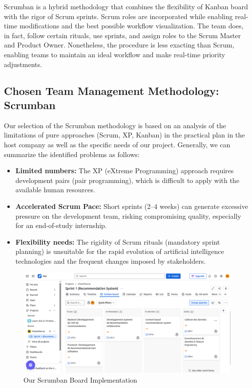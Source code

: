Scrumban is a hybrid methodology that combines the flexibility of Kanban board with the rigor of Scrum sprints. Scrum roles are incorporated while enabling real-time modifications and the best possible workflow visualization. The team does, in fact, follow certain rituals, use sprints, and assign roles to the Scrum Master and Product Owner. Nonetheless, the procedure is less exacting than Scrum, enabling teams to maintain an ideal workflow and make real-time priority adjustments.
   


\subsection{Chosen Team Management Methodology: Scrumban}
Our selection of the Scrumban methodology is based on an analysis of the limitations of pure approaches (Scrum, XP, Kanban) in the practical plan in the host company as well as the specific needs of our project. Generally, we can summarize the identified problems as follows:
\begin{itemize}
    \item \textbf{Limited numbers:}
    The XP (eXtreme Programming) approach requires development pairs (pair programming), which is difficult to apply with the available human resources.
        
    \item \textbf{Accelerated Scrum Pace:}
    Short sprints (2–4 weeks) can generate excessive pressure on the development team, risking compromising quality, especially for an end-of-study internship.    
        
    \item \textbf{Flexibility needs:}
    The rigidity of Scrum rituals (mandatory sprint planning) is unsuitable for the rapid evolution of artificial intelligence technologies and the frequent changes imposed by stakeholders.
    \end{itemize}
    
\begin{center}
\begin{figure}[H]
            \centering
            \includegraphics[scale=0.38]{images/kanbanBoard.png}
            \caption{Our Scrumban Board Implementation}
            \label{fig:Tableau_Scrumban}
\end{figure}
\end{center}

